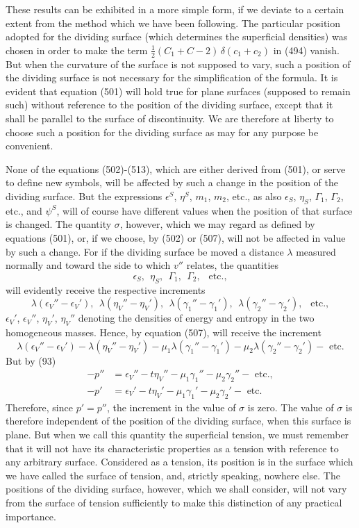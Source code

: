 \documentclass[12pt]{article}
\newcommand{\dd}{\delta}
\begin{document}
{These results can be exhibited in a more simple form, if we deviate to a certain extent from the method which we have been following. The particular position adopted for the dividing surface (which determines the superficial densities) was chosen in order to make the term  $\tfrac{1}{2}(C_1+C-2)\, \dd (c_1 +c_2)$ in (494) vanish. But when the curvature of the surface is not supposed to vary, such a position of the dividing surface is not necessary for the simplification of the formula. It is evident that equation (501) will hold true for plane surfaces (supposed to remain such) without reference to the position of the dividing surface, except that it shall be parallel to the surface of discontinuity. We are therefore at liberty to choose such a position for the dividing surface as may for any purpose be convenient.


None of the equations (502)-(513), which are either derived from (501), or serve to define new symbols, will be affected by such a change in the position of the dividing surface. But the expressions $\epsilon^S$, $\eta^S$, $m_1$, $m_2$, etc., as also $\epsilon_S$, $\eta_S$, $\Gamma_1$, $\Gamma_2$, etc., and $\psi^S$, will of course have different values when the position of that surface is changed. The quantity $\sigma$, however, which we may regard as defined by equations (501), or, if we choose, by (502) or (507), will not be affected in value by such a change. For if the dividing surface be moved a distance $\lambda$ measured normally and toward the side to which $v''$ relates, the quantities
$$\epsilon_S, \ \ \eta_S, \ \ \Gamma_1, \ \ \Gamma_2, \ \ \text{ etc.},$$
will evidently receive the respective increments
$$\lambda(\epsilon_{V}''-\epsilon_{V}'), \ \ \lambda(\eta_{V}''-\eta_{V}'), \ \ \lambda(\gamma_1''-\gamma_1'), \ \ \lambda(\gamma_2''-\gamma_2'), \ \  \text{ etc.}, $$
$\epsilon_{V}'$, $\epsilon_{V}''$, $\eta_{V}'$, $\eta_{V}''$ denoting the densities of energy and entropy in the two homogeneous masses. Hence, by equation (507),  will receive the increment
$$ \lambda(\epsilon_{V}''-\epsilon_{V}') - \lambda(\eta_{V}''-\eta_{V}')-\mu_1 \lambda(\gamma_1''-\gamma_1')-\mu_2 \lambda(\gamma_2''-\gamma_2') - \text{ etc.}$$
But by (93)
\begin{align*}
-p'' &= \epsilon_{V}'' - t\eta_V'' - \mu_1 \gamma_1'' - \mu_2 \gamma_2''  - \text{ etc.}, \\ 
-p' &= \epsilon_{V}' - t\eta_V' - \mu_1 \gamma_1' - \mu_2 \gamma_2'  - \text{ etc.}\end{align*}
Therefore, since $p'=p''$, the increment in the value of $\sigma$ is zero. The value of $\sigma$ is therefore independent of the position of the dividing surface, when this surface is plane. But when we call this quantity the superficial tension, we must remember that it will not have its characteristic properties as a tension with reference to any arbitrary surface. Considered as a tension, its position is in the surface which we have called the surface of tension, and, strictly speaking, nowhere else. The positions of the dividing surface, however, which we shall consider, will not vary from the surface of tension sufficiently to make this distinction of any practical importance.


}
\end{document}
